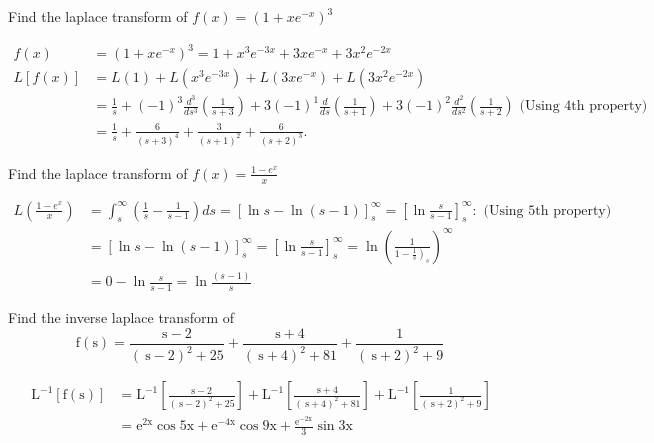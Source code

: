 \begin{exercise}
	Find the laplace transform of $f(x)=\left(1+x e^{-x}\right)^{3}$
\end{exercise}
\begin{answer}
	\begin{align*}
	f(x)&=\left(1+x e^{-x}\right)^{3}=1+x^{3} e^{-3 x}+3 x e^{-x}+3 x^{2} e^{-2 x} \\
	L[f(x)]&=L(1)+L\left(x^{3} e^{-3 x}\right)+L\left(3 x e^{-x}\right)+L\left(3 x^{2} e^{-2 x}\right)\\
	&=\frac{1}{s}+(-1)^{3} \frac{d^{3}}{d s^{3}}\left(\frac{1}{s+3}\right)+3(-1)^{1} \frac{d}{d s}\left(\frac{1}{s+1}\right)+3(-1)^{2} \frac{d^{2}}{d s^{2}}\left(\frac{1}{s+2}\right)\text{ (Using 4th property)}\\
	&=\frac{1}{s}+\frac{6}{(s+3)^{4}}+\frac{3}{(s+1)^{2}}+\frac{6}{(s+2)^{3}} \text {. }
	\end{align*}
\end{answer}
\begin{exercise}
	Find the laplace transform of $f(x)=\frac{1-e^{x}}{x}$
\end{exercise}
\begin{answer}
	\begin{align*}
	L\left(\frac{1-e^{x}}{x}\right)&=\int_{s}^{\infty}\left(\frac{1}{s}-\frac{1}{s-1}\right) d s=[\ln s-\ln (s-1)]_{s}^{\infty}=\left[\ln \frac{s}{s-1}\right]_{s}^{\infty}:\text{ (Using 5th property)}\\
	&=[\ln s-\ln (s-1)]_{s}^{\infty}=\left[\ln \frac{s}{s-1}\right]_{s}^{\infty}=\ln \left(\frac{1}{\left.1-\frac{1}{s}\right)_{s}}\right)^{\infty} \\
	&=0-\ln \frac{s}{s-1}=\ln \frac{(s-1)}{s}
	\end{align*}
\end{answer}
\begin{exercise}
	Find the inverse laplace transform of
	$$\mathrm{f}(\mathrm{s}) =\frac{\mathrm{s}-2}{(\mathrm{~s}-2)^{2}+25}+\frac{\mathrm{s}+4}{(\mathrm{~s}+4)^{2}+81}+\frac{1}{(\mathrm{~s}+2)^{2}+9} $$
\end{exercise}
\begin{answer}
	\begin{align*}
	\mathrm{~L}^{-1}[\mathrm{f}(\mathrm{s})] &=\mathrm{L}^{-1}\left[\frac{\mathrm{s}-2}{(\mathrm{~s}-2)^{2}+25}\right]+\mathrm{L}^{-1}\left[\frac{\mathrm{s}+4}{(\mathrm{~s}+4)^{2}+81}\right]+\mathrm{L}^{-1}\left[\frac{1}{(\mathrm{~s}+2)^{2}+9}\right] \\
	&=\mathrm{e}^{2 \mathrm{x}} \cos 5 \mathrm{x}+\mathrm{e}^{-4 \mathrm{x}} \cos 9 \mathrm{x}+\frac{\mathrm{e}^{-2 \mathrm{x}}}{3} \sin 3 \mathrm{x}
	\end{align*}
\end{answer}
